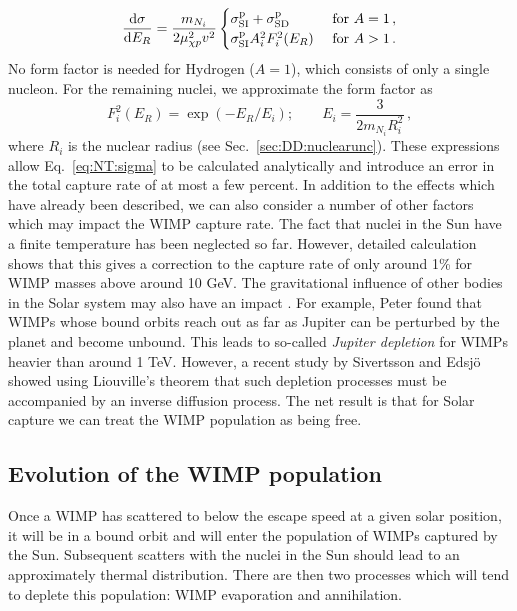 \begin{equation}
\dbd{\sigma}{E_R} = \frac{m_{N_i}}{2\mu_{\chi p}^2 v^2}
\begin{cases}
\sigmapsi + \sigmapsd & \textrm{ for } A = 1 \,,\\
\sigmapsi A_i^2 F_i^2(E_R) & \textrm{ for } A > 1 \,.
\end{cases}
\end{equation}
No form factor is needed for Hydrogen ($A=1$), which consists of only a single nucleon. For the remaining nuclei, we approximate the form factor as \cite{Gould:1987}
\begin{equation}
F^2_i(E_R) = \exp(-E_R/E_i); \qquad E_i = \frac{3}{2m_{N_i} R_i^2}\,,
\end{equation}
where $R_i$ is the nuclear radius (see Sec.~\ref{sec:DD:nuclearunc}). These expressions allow Eq.~\ref{eq:NT:sigma} to be calculated analytically and introduce an error in the total capture rate of at most a few percent.
In addition to the effects which have already been described, we can also consider a number of other factors which may impact the WIMP capture rate. The fact that nuclei in the Sun have a finite temperature has been neglected so far. However, detailed calculation \cite{Press:1985,Gould:1987} shows that this gives a correction to the capture rate of only around 1\% for WIMP masses above around 10 GeV. The gravitational influence of other bodies in the Solar system may also have an impact \cite{Gould:1991}. For example, Peter \cite{Peter:2009} found that WIMPs whose bound orbits reach out as far as Jupiter can be perturbed by the planet and become unbound. This leads to so-called \textit{Jupiter depletion} for WIMPs heavier than around 1 TeV. However, a recent study by Sivertsson and Edsj\"{o} \cite{Sivertsson:2012} showed using Liouville's theorem that such depletion processes must be accompanied by an inverse diffusion process. The net result is that for Solar capture we can treat the WIMP population as being free.



\subsection{Evolution of the WIMP population}

Once a WIMP has scattered to below the escape speed at a given solar position, it will be in a bound orbit and will enter the population of WIMPs captured by the Sun. Subsequent scatters with the nuclei in the Sun should lead to an approximately thermal distribution. There are then two processes which will tend to deplete this population: WIMP evaporation and annihilation.

